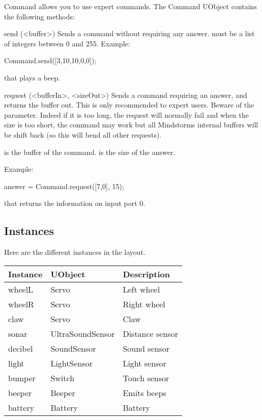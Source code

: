 Command allows you to use expert commands. The Command UObject contains the
following methods:
\begin{urbiscriptapi}
\item[send](<buffer>) Sends a command without requiring any answer.
   must be a list of integers between 0 and 255.  Example:
\begin{urbiunchecked}
Command.send([3,10,10,0,0]);
\end{urbiunchecked}

that plays a beep.

\item[request](<bufferIn>, <sizeOut>)%
  Sends a command requiring an answer, and returns the buffer out. This is
  only recommended to expert users. Beware of the 
  parameter. Indeed if it is too long, the request will normally fail and
  when the size is too short, the command may work but all Mindstorms
  internal buffers will be shift back (so this will bend all other
  requests).

   is the buffer of the command.  is the size of
  the answer.

  Example:
\begin{urbiunchecked}
answer = Command.request([7,0], 15);
\end{urbiunchecked}

that returns the information on input port 0.
\end{urbiscriptapi}

\subsection{Instances}
Here are the different instances in the  layout.

\begin{tabular}{|l|l|l|}
  \hline
  Instance & UObject          & Description    \\
  \hline
  wheelL   & Servo            & Left wheel     \\
  wheelR   & Servo            & Right wheel    \\
  claw     & Servo            & Claw           \\
  sonar    & UltraSoundSensor & Distance sensor\\
  decibel  & SoundSensor      & Sound sensor   \\
  light    & LightSensor      & Light sensor   \\
  bumper   & Switch           & Touch sensor   \\
  beeper   & Beeper           & Emits beeps    \\
  battery  & Battery          & Battery        \\
  \hline
\end{tabular}

